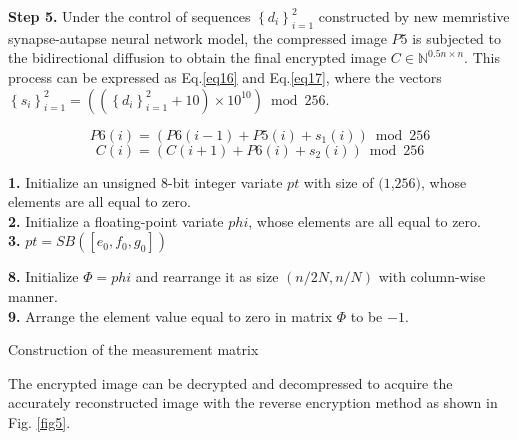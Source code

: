 \documentclass[journal]{IEEEtran/IEEEtran}
\begin{document}
\textbf{Step 5.} Under the control of sequences  $\left\{d_{i}\right\}_{i=1}^{2}$ constructed by new memristive synapse-autapse  neural network model, the compressed image $P5$  is subjected to the bidirectional diffusion to obtain the final encrypted image $C \in \mathbb{N}^{0.5 n \times n}$. This process can be expressed as Eq.\ref{eq16} and Eq.\ref{eq17}, where the vectors  $\left\{s_{i}\right\}_{i=1}^{2}=\left(\left(\left\{d_{i}\right\}_{i=1}^{2}+10\right) \times 10^{10}\right) \bmod 256$.

\begin{equation}\label{eq16}
P 6(i)=\left(P 6(i-1)+P 5(i)+s_{1}(i)\right) \bmod 256
\end{equation}
\begin{equation}\label{eq17}
C(i)=\left(C(i+1)+P 6(i)+s_{2}(i)\right) \bmod 256
\end{equation}


\begin{algorithm}



\textbf{1.} Initialize an unsigned 8-bit integer variate  $pt$ with size of  $\textit{(1,256)}$, whose elements are all equal to zero.\\
\textbf{2.} Initialize a floating-point variate $phi$, whose elements are all equal to zero.\\
\textbf{3.} $p t=SB\left(\left[e_{0}, f_{0}, g_{0}\right]\right)$


	
\textbf{8.} Initialize $\Phi=p h i$ and rearrange it as size $(n / 2 N, n / N)$ with column-wise manner.	\\
\textbf{9.} Arrange the element value equal to zero in matrix $\Phi$ to be $-1$.
    
   \caption{Construction of the measurement matrix}\label{algo2}
\end{algorithm}

The encrypted image can be decrypted and decompressed to acquire the accurately reconstructed image with the reverse encryption method as shown in Fig. \ref{fig5}. 
\end{document}
